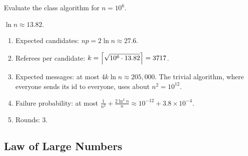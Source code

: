 \begin{exercisebox}
\begin{pproblem}[Numbers for $n = 1{,}000{,}000$]\label{pp:leader-num}
    Evaluate the class algorithm for $n = 10^6$.
\end{pproblem}
\tcblower
\begin{wsolution}
    $\ln n \approx 13.82$.
    \begin{enumerate}
        \item Expected candidates: $np = 2 \ln n \approx 27.6$.
        \item Referees per candidate: $k = \left\lceil\sqrt{10^6 \cdot 13.82}\right\rceil = 3717$.
        \item Expected messages: at most $4k \ln n \approx 205{,}000$. The trivial algorithm, where
              everyone sends its id to everyone, uses about $n^2 = 10^{12}$.
        \item Failure probability: at most
              $\frac{1}{n^2} + \frac{2 \ln^2 n}{n} \approx 10^{-12} + 3.8 \times 10^{-4}$.
        \item Rounds: $3$. \qedhere
    \end{enumerate}
\end{wsolution}
\end{exercisebox}


\subsection{Law of Large Numbers}

